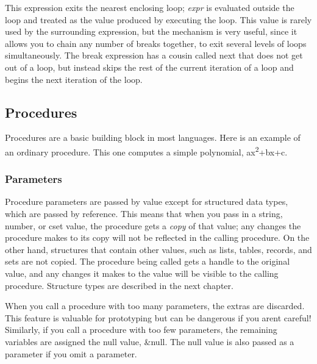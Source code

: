 This expression exits the nearest enclosing loop; \textsf{\textit{expr}}
is evaluated outside the loop and treated as the value produced by
executing the loop. This value is rarely used by the surrounding
expression, but the mechanism is very useful, since it allows you to
chain any number of breaks together, to exit several levels of loops
simultaneously. The \textsf{break} expression has a cousin called
\textsf{next} that does not get out of a loop, but instead skips the
rest of the current iteration of a loop and begins the next iteration
of the loop.

\subsection[Procedures]{Procedures}
Procedures are a basic building block in most
languages. Here is an example of an ordinary procedure. This one
computes a simple polynomial, ax\textsuperscript{2}+bx+c.


\subsubsection{Parameters}

Procedure parameters are passed by value except for
structured data types, which are passed by
reference. This means that when you pass in a string,
number, or cset value, the procedure gets a \textit{copy} of that
value; any changes the procedure makes to its copy will not be
reflected in the calling procedure. On the other hand, structures that
contain other values, such as lists, tables, records, and sets are not
copied. The procedure being called gets a handle to the original value,
and any changes it makes to the value will be visible to the calling
procedure. Structure types are described in the next chapter.

When you call a procedure with too many
parameters, the extras are discarded. This feature is valuable for
prototyping but can be dangerous if you aren{\textquotesingle}t
careful! Similarly, if you call a procedure with too few parameters,
the remaining variables are assigned the null value, \textsf{\&null}.
The null value is also passed as a parameter if you omit a parameter.

